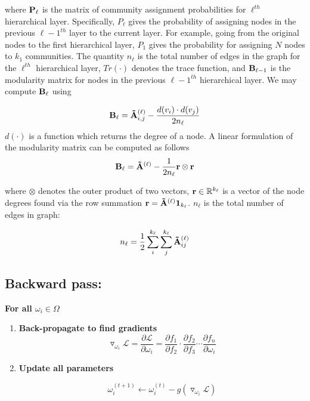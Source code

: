 \documentclass[a4paper,12pt]{article}
\begin{document}
					where ${\bf P}_\ell$ is the matrix of community assignment probabilities for $\ell^{th}$ hierarchical layer. Specifically, ${P}_\ell$ gives the probability of assigning nodes in the previous $\ell -1 ^{th}$ layer to the current layer. For example, going from the original nodes to the first hierarchical layer, ${P}_1$ gives the probability for assigning $N$ nodes to $k_1$ communities. The quantity $n_{\ell}$ is the total number of edges in the graph for the  $\ell^{th}$ hierarchical layer, $Tr(\cdot)$ denotes the trace function, and ${\bf B}_{\ell-1}$ is the modularity matrix for nodes in the previous  $\ell-1^{th}$ hierarchical layer. We may compute ${\bf B}_\ell$ using
					
					\[{\bf B_\ell} = {\bf \tilde A}^{(\ell)}_{i,j} - \frac{d(v_i)\cdot d(v_j)}{2n_\ell}\]
					$d(\cdot)$ is a function which returns the degree of a node. A linear formulation of the modularity matrix can be computed as follows
					\[ {\bf B}_\ell = {\bf \tilde A}^{(\ell)} - \frac{1}{2n_\ell}{\bf r}\otimes{\bf r}\]
					
					where $\otimes$ denotes the outer product of two vectors, ${\bf r}\in\mathbb{R}^{k_\ell}$ is a vector of the node degrees found via the row summation ${\bf r}={\bf \tilde A}^{(\ell)}{\bf 1}_{k_\ell}$. $n_\ell$ is the total number of edges in graph:
					
					\[n_\ell = \frac{1}{2}\sum_i^{k_\ell} \sum_j^{k_\ell} {\bf \tilde A}^{(\ell)}_{ij}\]
					
		
			
		\subsection{Backward pass:}
			\textbf{For all $\omega_i \in \Omega$} 
			\begin{enumerate}
				\item[]{\textbf{Back-propagate to find gradients} 
					\[\triangledown_{\omega_i} \mathcal{L} =  \frac{\partial\mathcal{L}}{\partial {\omega_i}} = \frac{\partial f_1}{\partial f_2}\cdot\frac{\partial f_2}{\partial f_3}\cdots\frac{\partial f_n}{\partial \omega_i} \]}
				
				\item[]{\textbf{Update all parameters}
					
					\[\omega_i^{(t+1)} \leftarrow \omega_i^{(t)} - g\left(\triangledown_{\omega_i}\mathcal{L}\right) \]
				
				}  
			\end{enumerate}
			
\end{document}
